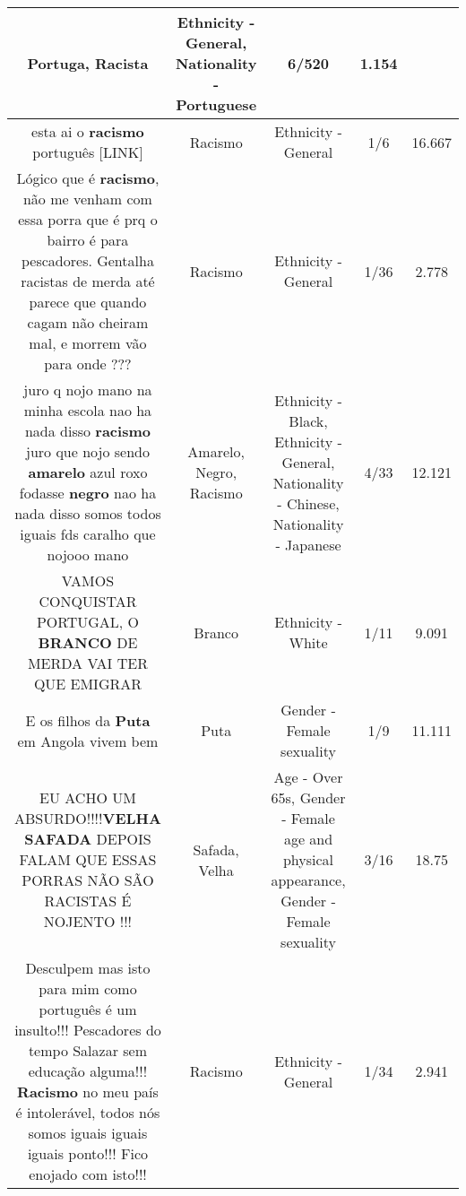 \documentclass[11pt]{article}
\newlength\mylength
\begin{document}
\begin{center}
\begin{longtable}{|C{.65\mylength}|C{.30\mylength}|C{.12\mylength}|C{.12\mylength}|C{.12\mylength}|}
Portuga, Racista & Ethnicity - General, Nationality - Portuguese & 6/520 & 1.154 \\  \hline
  \small esta ai o \textbf{racismo} português [LINK] \normalsize   & Racismo & Ethnicity - General & 1/6 & 16.667 \\  \hline
  \small Lógico que é \textbf{racismo}, não me venham com essa porra que é prq o bairro é para pescadores. Gentalha racistas de merda até parece que quando cagam não cheiram mal, e morrem vão para onde ???\normalsize   & Racismo & Ethnicity - General & 1/36 & 2.778 \\  \hline
  \small juro q nojo mano na minha escola nao ha nada disso \textbf{racismo} juro que nojo sendo \textbf{a\textbf{marelo}} azul roxo fodasse \textbf{negro} nao ha nada disso somos todos iguais fds caralho que nojooo mano\normalsize   & Amarelo, Negro, Racismo & Ethnicity - Black, Ethnicity - General, Nationality - Chinese, Nationality - Japanese & 4/33 & 12.121 \\  \hline
  \small VAMOS CONQUISTAR PORTUGAL, O \textbf{BRANCO} DE MERDA VAI TER QUE EMIGRAR\normalsize   & Branco & Ethnicity - White & 1/11 & 9.091 \\  \hline
  \small E os filhos da \textbf{Puta} em Angola vivem bem\normalsize   & Puta & Gender - Female sexuality & 1/9 & 11.111 \\  \hline
  \small EU ACHO UM ABSURDO!!!!\textbf{V\textbf{ELHA}} \textbf{SAFADA} DEPOIS FALAM QUE ESSAS PORRAS NÃO SÃO RACISTAS É NOJENTO !!!\normalsize   & Safada, Velha & Age - Over 65s, Gender - Female age and physical appearance, Gender - Female sexuality & 3/16 & 18.75 \\  \hline
  \small Desculpem mas isto para mim como português é  um insulto!!! Pescadores do tempo Salazar sem educação alguma!!! \textbf{Racismo} no meu país é intolerável, todos nós somos iguais iguais iguais ponto!!!  Fico enojado com isto!!!\normalsize   & Racismo & Ethnicity - General & 1/34 & 2.941 \\  \hline

\end{longtable}
\end{center}
\end{document}
